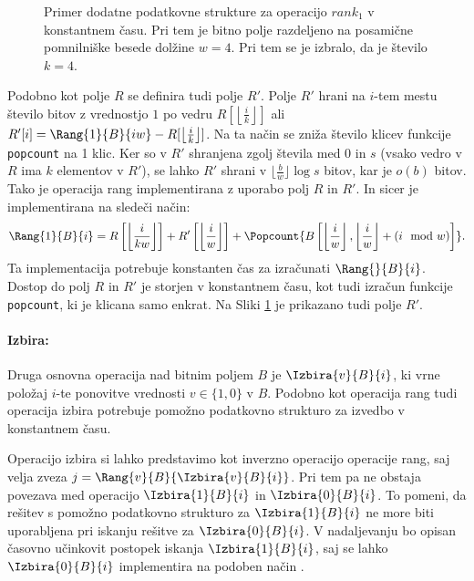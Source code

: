 \begin{figure}[htb]
    \begin{center}
        
        \caption{Primer dodatne podatkovne strukture za operacijo $rank_1$ v konstantnem času. Pri tem je bitno polje razdeljeno na posamične pomnilniške besede dolžine $w=4$. Pri tem se je izbralo, da je število $k=4$.} 
        \label{fig:rank}
    \end{center}
\end{figure}

Podobno kot polje $R$ se definira tudi polje $R'$. Polje $R'$ hrani na $i$-tem mestu število bitov z vrednostjo $1$ po vedru $R[\left\lfloor\frac{i}{k} \right\rfloor]$ ali $R'[i]=\Rang{1}{B}{iw}-R[\left\lfloor\frac{i}{k} \right\rfloor]$. Na ta način se zniža število klicev funkcije \texttt{popcount} na 1 klic. Ker so v $R'$ shranjena zgolj števila med 0 in $s$ (vsako vedro v $R$ ima $k$ elementov v $R'$), se lahko $R'$ shrani v $\lfloor\frac{b}{w}\rfloor\log{s}$ bitov, kar je $o(b)$ bitov. Tako je operacija rang implementirana z uporabo polj $R$ in $R'$. In sicer je implementirana na sledeči način:
\begin{equation*}
    \Rang{1}{B}{i}=R\left[\left\lfloor\frac{i}{kw} \right\rfloor\right]+ R'\left[\left\lfloor\frac{i}{w} \right\rfloor\right]+\Popcount{B\left[\left\lfloor\frac{i}{w} \right\rfloor,\left\lfloor\frac{i}{w} \right\rfloor+(i \mod w)\right]}.
\end{equation*}
Ta implementacija potrebuje konstanten čas za izračunati $\Rang{}{B}{i}$. Dostop do polj $R$ in $R'$ je storjen v konstantnem času, kot tudi izračun funkcije \texttt{popcount}, ki je klicana samo enkrat\cite{Navarro2016}. Na Sliki \ref{fig:rank} je prikazano tudi polje $R'$.

\paragraph{Izbira:}
Druga osnovna operacija nad bitnim poljem $B$ je $\Izbira{v}{B}{i}$, ki vrne položaj $i$-te ponovitve vrednosti $v\in\{1,0\}$ v $B$. Podobno kot operacija rang tudi operacija izbira potrebuje pomožno podatkovno strukturo za izvedbo v konstantnem času. 

Operacijo izbira si lahko predstavimo kot inverzno operacijo operacije rang, saj velja zveza $j=\Rang{v}{B}{\Izbira{v}{B}{i}}$. Pri tem pa ne obstaja povezava med operacijo $\Izbira{1}{B}{i}$ in $\Izbira{0}{B}{i}$. To pomeni, da rešitev s pomožno podatkovno strukturo za $\Izbira{1}{B}{i}$ ne more biti uporabljena pri iskanju rešitve za $\Izbira{0}{B}{i}$. V nadaljevanju bo opisan časovno učinkovit postopek iskanja $\Izbira{1}{B}{i}$, saj se lahko $\Izbira{0}{B}{i}$ implementira na podoben način \cite{Navarro2016}.

